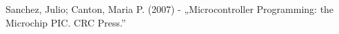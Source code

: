 \cleardoublepage
{}
{}
\begin{thebibliography}{999}
\begin{spacing}{1}
     Sanchez, Julio; Canton, Maria P. (2007) - „Microcontroller Programming: the Microchip PIC. CRC Press.”
    \url{}
\end{spacing}
\end{thebibliography}